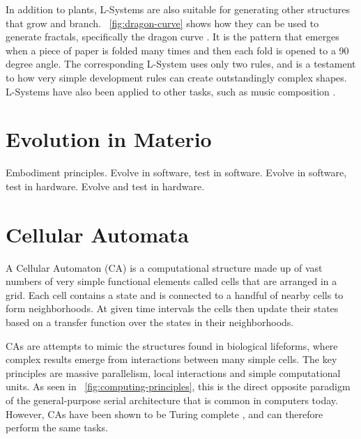 
In addition to plants, L-Systems are also suitable for generating other structures that grow and branch.
\figurename~\ref{fig:dragon-curve} shows how they can be used to generate fractals, specifically the dragon curve \cite{gardner1967heighway}.
It is the pattern that emerges when a piece of paper is folded many times and then each fold is opened to a 90 degree angle.
The corresponding L-System uses only two rules, and is a testament to how very simple development rules can create outstandingly complex shapes.
L-Systems have also been applied to other tasks, such as music composition \cite{manousakis2006musical}.


\section{Evolution in Materio}

\TODO
Embodiment principles.
Evolve in software, test in software.
Evolve in software, test in hardware.
Evolve and test in hardware.


\section{Cellular Automata}

A Cellular Automaton (CA) is a computational structure made up of vast numbers of very simple functional elements called cells that are arranged in a grid.
Each cell contains a state and is connected to a handful of nearby cells to form neighborhoods.
At given time intervals the cells then update their states based on a transfer function over the states in their neighborhoods.\footnotemark


CAs are attempts to mimic the structures found in biological lifeforms, where complex results emerge from interactions between many simple cells.
The key principles are massive parallelism, local interactions and simple computational units.
As seen in \figurename~\ref{fig:computing-principles}, this is the direct opposite paradigm of the general-purpose serial architecture that is common in computers today.
However, CAs have been shown to be Turing complete \cite{codd1968cellular, neumann1966selfreplication}, and can therefore perform the same tasks.

